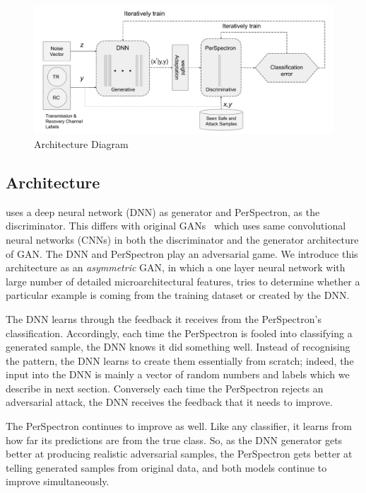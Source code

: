 \begin{figure}[ht!]
\centering
\includegraphics[width=\textwidth]{PerSpectron-Micro2020-camera-R/img/Brutus.pdf}

\caption{\scheme{} Architecture Diagram }

\label{fig:algdiagram}
\end{figure}

\subsection{{\scheme} Architecture}

{\scheme} uses a deep neural network (DNN) as generator and PerSpectron,  as the discriminator. This differs with original  GANs~\cite{goodfellow2014generative} which uses same convolutional neural
networks (CNNs) in both the discriminator and the generator
architecture of GAN.  The DNN and PerSpectron play an
adversarial game. We introduce this architecture as an {\em asymmetric} GAN, in which a one layer neural network with large number of detailed microarchitectural features, tries to determine whether a particular example is coming from the training dataset or created by the DNN. 

The DNN learns through the feedback it receives from the PerSpectron's classification. 
 Accordingly, each time the PerSpectron is fooled into classifying a generated sample, the DNN knows it did something well. Instead of recognising the pattern, the DNN learns to create them essentially from scratch; indeed, the input into the DNN is mainly a vector of random numbers and labels which we describe in next section.  Conversely each time the PerSpectron  rejects an adversarial attack, the DNN receives the feedback that it needs to improve.

The PerSpectron continues to improve as well. Like any classifier, it learns from how far its predictions are from the true class. 
So, as the DNN generator gets better at producing realistic adversarial samples, the PerSpectron gets better at telling generated samples from original data, and both models continue to improve simultaneously. 


